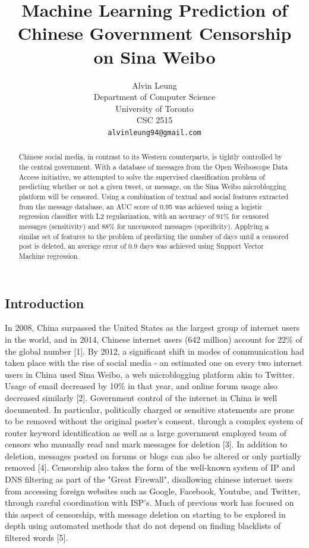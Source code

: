 \documentclass{article} %
\title{Machine Learning Prediction of Chinese Government Censorship on Sina Weibo}
\author{
Alvin Leung \\
Department of Computer Science\\
University of Toronto\\
CSC 2515\\
\texttt{alvinleung94@gmail.com} \\
}
\begin{document}
\begin{CJK*}{UTF8}{gbsn}

\maketitle

\begin{abstract}

Chinese social media, in contrast to its Western counterparts, is tightly controlled by the central government. With a database of messages from the Open Weiboscope Data Access initiative, we attempted to solve the supervised classification problem of predicting whether or not a given tweet, or message, on the Sina Weibo microblogging platform will be censored. Using a combination of textual and social features extracted from the message database, an AUC score of 0.95 was achieved using a logistic regression classifier with L2 regularization, with an accuracy of 91\% for censored messages (sensitivity) and 88\% for uncensored messages (specificity). Applying a similar set of features to the problem of predicting the number of days until a censored post is deleted, an average error of 0.9 days was achieved using Support Vector Machine regression.

\end{abstract}

\section{Introduction}
In 2008, China surpassed the United States as the largest group of internet users in the world, and in 2014, Chinese internet users (642 million) account for 22\% of the global number [1]. By 2012, a significant shift in modes of communication had taken place with the rise of social media - an estimated one on every two internet users in China used Sina Weibo, a web microblogging platform akin to Twitter. Usage of email decreased by 10\% in that year, and online forum usage also decreased similarly [2]. Government control of the internet in China is well documented. In particular, politically charged or sensitive statements are prone to be removed without the original poster's consent, through a complex system of router keyword identification as well as a large government employed team of censors who manually read and mark messages for deletion [3]. In addition to deletion, messages posted on forums or blogs can also be altered or only partially removed [4]. Censorship also takes the form of the well-known system of IP and DNS filtering as part of the "Great Firewall", disallowing chinese internet users from accessing foreign websites such as Google, Facebook, Youtube, and Twitter, through careful coordination with ISP's. Much of previous work has focused on this aspect of censorship, with message deletion on starting to be explored in depth using automated methods that do not depend on finding blacklists of filtered words [5].


\end{CJK*}
\end{document}
